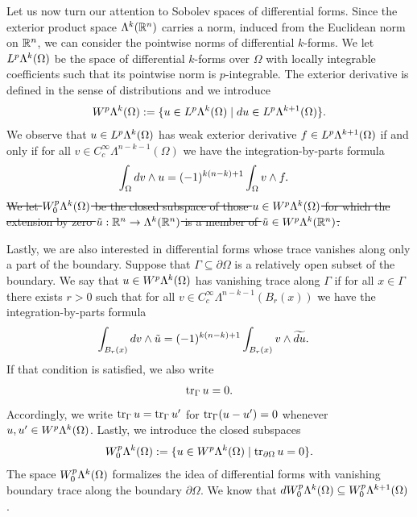 \documentclass[10pt,letterpaper]{article}
\newcommand\cye[1]{%
  \protect\leavevmode
  \begingroup
    \color{red!35!yellow}%
    #1%
  \endgroup
}
\begin{document}
Let us now turn our attention to Sobolev spaces of differential forms. 
Since the exterior product space $\Lambda^{k}({\mathbb R}^{n})$ carries a norm, induced from the Euclidean norm on ${\mathbb R}^{n}$, we can consider the pointwise norms of differential $k$-forms. 
We let $L^{p}\Lambda^{k}(\Omega)$ be the space of differential $k$-forms over $\Omega$ with locally integrable coefficients 
such that its pointwise norm is $p$-integrable. 
The exterior derivative is defined in the sense of distributions and we introduce 
\begin{gather*}
    W^{p}\Alt^{k}(\Omega) 
    := 
    \{ u \in L^{p}\Alt^{k}(\Omega) \suchthat \cartan u \in L^{p}\Alt^{k+1}(\Omega) \}
    .
\end{gather*}
We observe that $u \in L^{p}\Lambda^{k}(\Omega)$ has weak exterior derivative $f \in L^{p}\Lambda^{k+1}(\Omega)$
if and only if for all $v \in C^{\infty}_{c}\Lambda^{n-k-1}(\Omega)$ we have the integration-by-parts formula
\begin{align*}
    \int_{\Omega} d v \wedge u
    &=
    (-1)^{k(n-k)+1}
    \int_{\Omega} v \wedge f 
    .
\end{align*}
\cye{\sout{We let $W^{p}_{0}\Lambda^{k}(\Omega)$ be the closed subspace of those $u \in W^{p}\Lambda^{k}(\Omega)$ 
for which the extension by zero $\tilde u : {\mathbb R}^{n} \rightarrow \Lambda^{k}({\mathbb R}^{n})$ is a member of $\tilde u \in W^{p}\Lambda^{k}({\mathbb R}^{n})$. }}

Lastly, we are also interested in differential forms whose trace vanishes along only a part of the boundary. 
Suppose that $\Gamma \subseteq \partial\Omega$ is a relatively open subset of the boundary. 
We say that $u \in W^{p}\Lambda^{k}(\Omega)$ has vanishing trace along $\Gamma$ if for all $x \in \Gamma$ there exists $r > 0$
such that for all $v \in C^{\infty}_{c}\Lambda^{n-k-1}(B_r(x))$ we have the integration-by-parts formula
\begin{align*}
    \int_{B_r(x)} d v \wedge \tilde u
    &=
    (-1)^{k(n-k)+1}
    \int_{B_r(x)} v \wedge \widetilde{d u}
    .
\end{align*}
If that condition is satisfied, we also write 
\begin{align*}
    \operatorname{tr}_{\Gamma} u = 0
    .
\end{align*}
Accordingly, we write $\operatorname{tr}_{\Gamma} u = \operatorname{tr}_{\Gamma} u'$ for $\operatorname{tr}_{\Gamma} (u-u') = 0$ whenever $u, u' \in W^{p}\Lambda^{k}(\Omega)$.
Lastly, we introduce the closed subspaces 
\begin{gather*}
    W^{p}_{0}\Alt^{k}(\Omega) 
    := 
    \{ u \in W^{p}\Alt^{k}(\Omega) \suchthat \trace_{\partial \Omega} u = 0 \}
    .
\end{gather*}
\cye{The space $W^{p}_{0}\Lambda^{k}(\Omega)$ formalizes the idea of differential forms with vanishing boundary trace along the boundary $\partial\Omega$.}
We know that $d W^{p}_{0}\Lambda^{k}(\Omega) \subseteq W^{p}_{0}\Lambda^{k+1}(\Omega)$.
\end{document}
